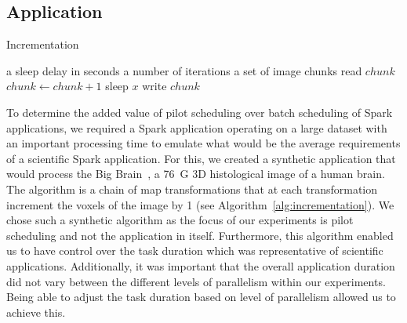 \documentclass{IEEEtran}
\newcommand{\Desc}[2]{\State \makebox[2em][l]{#1}#2}
\begin{document}
    \subsection{Application}
        \begin{algorithm}\caption{Incrementation}\label{alg:incrementation}              
            \begin{algorithmic}[1]                                                       
                \Input                                                                       
                    \Desc{$x$}{a sleep delay in seconds}                                         
                    \Desc{$n$}{a number of iterations}                                           
                    \Desc{$C$}{a set of image chunks}                                            
                \EndInput                                                                    
                    \State read $chunk$                                        
                        \State $chunk\gets chunk+1$                                              
                        \State sleep $x$                               
                    \EndFor                                                                      
                    \State write $chunk$                                            
                \EndFor                                                                      
            \end{algorithmic}                                                                
        \end{algorithm}
    To determine the added value of pilot scheduling over batch scheduling of Spark
    applications, we required a Spark application operating on a large dataset with
    an important processing time to emulate what would be the average requirements
    of a scientific Spark application. For this, we created a synthetic application 
    that would process the Big Brain~\cite{amunts2013bigbrain}, a 76~G 3D histological
    image of a human brain. The algorithm is a chain of map transformations that
    at each transformation increment the voxels of the image by 1 (see Algorithm~\ref{alg:incrementation}).
    We chose such a synthetic algorithm
    as the focus of our experiments is pilot scheduling and not the application in
    itself. Furthermore, this algorithm enabled us to have control over the task duration
    which was representative of scientific applications. Additionally, it was important
    that the overall application duration did not vary between the different levels of
    parallelism within our experiments. Being able to adjust the task duration based on
    level of parallelism allowed us to achieve this.
\end{document}
